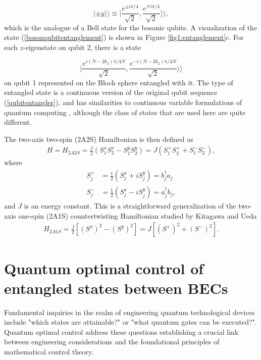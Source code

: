 \documentclass[
aps,%
12pt,%
final,%
notitlepage,%
oneside,%
onecolumn,%
nobibnotes,%
nofootinbib,%
superscriptaddress,%
noshowpacs,%
centertags]%
{revtex4}
\begin{document}
\begin{equation}
| \pm y \rangle \rangle \equiv | \frac{e^{\pm i\pi/4}}{\sqrt{2}}  , \frac{e^{\mp i \pi/4}}{\sqrt{2}} \rangle \rangle  ,
\end{equation}
which is the analogue of a Bell state for the bosonic qubits. A visualization of the state (\ref{bosonqubitentanglement}) is shown in Figure \ref{fig1:entanglement}c. For each $z$-eigenstate on qubit 2, there is a state 


\begin{equation} 
    | \frac{e^{i(N-2 k_2) \pi/4N}}{\sqrt{2}}  , \frac{e^{-i(N-2 k_2) \pi/4N}}{\sqrt{2}} \rangle \rangle  
\end{equation} 
%
on qubit 1 represented on the Bloch sphere entangled with it. The type of entangled state is a continuous version of the original qubit sequence (\ref{qubitentangler}), and has similarities to continuous variable formulations of quantum computing \cite{braunstein2005quantum}, although the class of states that are used here are quite different.

The two-axis two-spin (2A2S) Hamiltonian is then defined as
%
\begin{align}
H = H_{2A2S} = \frac{J}{2} (S_1^x S_2^x - S_1^y S_2^y) = J(S_1^+ S_2^+ + S_1^-S_2^-) ,  
\label{eq:Hamiltonian}
\end{align}
%
where 
%
\begin{align}
S_j^{+} & = \frac{1}{2} (S_j^x + i S_j^y) = b_j^\dagger a_j \nonumber \\
S_j^{-} & =  \frac{1}{2}  (S_j^x - i S_j^y)= a_j^\dagger b_j ,
\end{align}
%
and $ J $ is an energy constant. This is a straightforward generalization of the two-axis one-spin (2A1S) countertwisting Hamiltonian studied by Kitagawa and Ueda \cite{kitagawa1993squeezed}
%
\begin{align}
H_{2A1S} = \frac{J}{2} [ (S^x)^2  - (S^y)^2 ] = J[ (S^+)^2 + (S^-)^2 ] .  
\end{align}
%

\section{Quantum optimal control of entangled states between BECs}

Fundamental inquiries in the realm of engineering quantum technological devices include "which states are attainable?" or "what quantum gates can be executed?". Quantum optimal control address these questions establishing a crucial link between engineering considerations and the foundational principles of mathematical control theory. 
\end{document}
